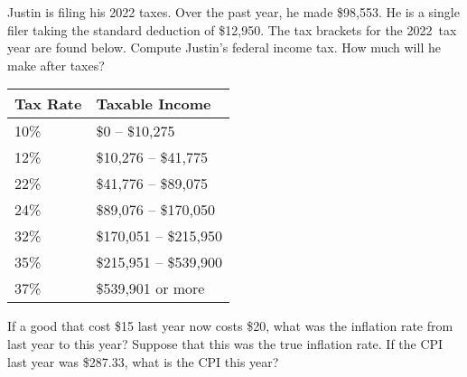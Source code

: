 \documentclass[11pt,letterpaper]{article}
\begin{document}

 Justin is filing his 2022 taxes. Over the past year, he made \$98,553. He is a single filer taking the standard deduction of \$12,950. The tax brackets for the 2022~tax year are found below. Compute Justin's federal income tax. How much will he make after taxes?  \par
	\begin{table}[!ht]
	\centering
	\begin{tabular}{|l|l|} \hline
	Tax Rate & Taxable Income \\ \hline
	10\% & \$0 -- \$10,275 \\ \hline
	12\% & \$10,276 -- \$41,775 \\ \hline
	22\% & \$41,776 -- \$89,075 \\ \hline
	24\% & \$89,076 -- \$170,050 \\ \hline
	32\% & \$170,051 -- \$215,950 \\ \hline
	35\% & \$215,951 -- \$539,900 \\ \hline
	37\% & \$539,901 or more \\ \hline
	\end{tabular}
	\end{table}



\newpage



 If a good that cost \$15 last year now costs \$20, what was the inflation rate from last year to this year? Suppose that this was the true inflation rate. If the CPI last year was \$287.33, what is the CPI this year?
\end{document}

